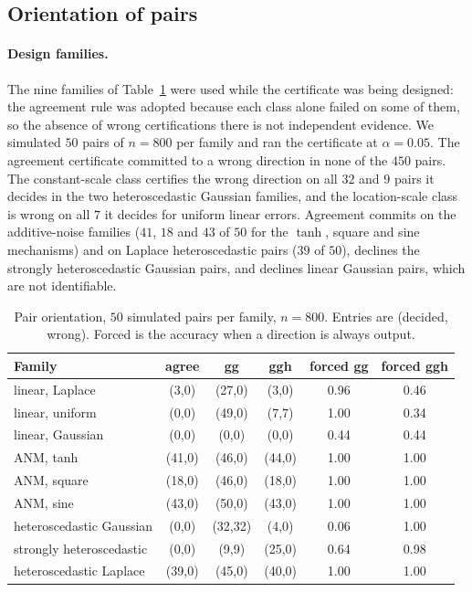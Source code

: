\subsection{Orientation of pairs}\label{sec:exp-pairs}

\paragraph{Design families.} The nine families of Table~\ref{tab:pairs} were
used while the certificate was being designed: the agreement rule was adopted
because each class alone failed on some of them, so the absence of wrong
certifications there is not independent evidence. We simulated $50$ pairs of
$n=800$ per family and ran the certificate at $\alpha=0.05$. The agreement
certificate committed to a wrong direction in none of the $450$ pairs. The
constant-scale class certifies the wrong direction on all $32$ and $9$ pairs it
decides in the two heteroscedastic Gaussian families, and the location-scale class
is wrong on all $7$ it decides for uniform linear errors. Agreement commits on the
additive-noise families ($41$, $18$ and $43$ of $50$ for the $\tanh$, square and sine
mechanisms)
and on Laplace heteroscedastic pairs ($39$ of $50$), declines the strongly
heteroscedastic Gaussian pairs, and declines linear Gaussian pairs, which are not
identifiable.

\begin{table}[t]
\caption{Pair orientation, $50$ simulated pairs per family, $n=800$. Entries are
(decided, wrong). Forced is the accuracy when a direction is always output.}
\label{tab:pairs}
\small
\begin{tabular}{@{}lccccc@{}}
\toprule
Family & agree & gg & ggh & forced gg & forced ggh\\
\midrule
linear, Laplace & (3,0) & (27,0) & (3,0) & 0.96 & 0.46\\
linear, uniform & (0,0) & (49,0) & (7,7) & 1.00 & 0.34\\
linear, Gaussian & (0,0) & (0,0) & (0,0) & 0.44 & 0.44\\
ANM, tanh & (41,0) & (46,0) & (44,0) & 1.00 & 1.00\\
ANM, square & (18,0) & (46,0) & (18,0) & 1.00 & 1.00\\
ANM, sine & (43,0) & (50,0) & (43,0) & 1.00 & 1.00\\
heteroscedastic Gaussian & (0,0) & (32,32) & (4,0) & 0.06 & 1.00\\
strongly heteroscedastic & (0,0) & (9,9) & (25,0) & 0.64 & 0.98\\
heteroscedastic Laplace & (39,0) & (45,0) & (40,0) & 1.00 & 1.00\\
\bottomrule
\end{tabular}
\end{table}

